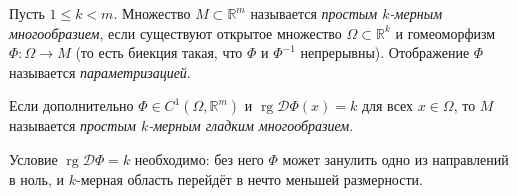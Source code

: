 



\begin{defn}
  Пусть $1 \leq k < m$. Множество $M \subset \mathbb{R}^m$ называется
  \emph{простым $k$-мерным многообразием}, если существуют открытое
  множество $\Omega \subset \mathbb{R}^k$ и гомеоморфизм $\Phi: \Omega \to M$
  (то есть биекция такая, что $\Phi$ и $\Phi^{-1}$ непрерывны).
  Отображение $\Phi$ называется \emph{параметризацией}.
\end{defn}

\begin{defn}
  Если дополнительно $\Phi \in C^1(\Omega, \mathbb{R}^m)$ и
  $\operatorname{rg} \mathcal{D}\Phi(x) = k$ для всех $x \in \Omega$,
  то $M$ называется \emph{простым $k$-мерным гладким многообразием}.
\end{defn}

\begin{note}
  Условие $\operatorname{rg} \mathcal{D}\Phi = k$ необходимо: без него
  $\Phi$ может занулить одно из направлений в ноль, и $k$-мерная
  область перейдёт в нечто меньшей размерности.
\end{note}


